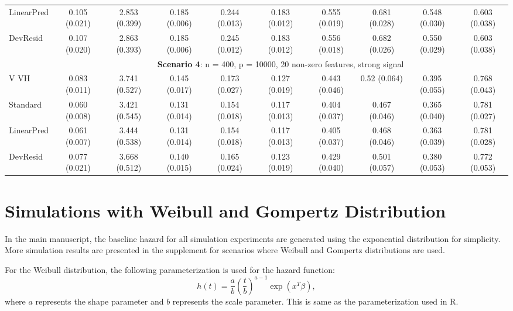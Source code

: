 \documentclass{article}
\begin{document}
\begin{landscape}
\begin{table}[h]
\begin{tabular}[t]{lccccccccc}
 LinearPred  & 0.105 (0.021) & 2.853 (0.399) & 0.185 (0.006) & 0.244 (0.013) & 0.183 (0.012) & 0.555 (0.019) & 0.681 (0.028) & 0.548 (0.030) & 0.603 (0.038) \\
 DevResid  & 0.107 (0.020) & 2.863 (0.393) & 0.185 (0.006) & 0.245 (0.012) & 0.183 (0.012) & 0.556 (0.018) & 0.682 (0.026) & 0.550 (0.029) & 0.603 (0.038) \\
\addlinespace
&\multicolumn{9}{c}{\textbf{Scenario 4}: n = 400, p = 10000, 20 non-zero features, strong signal}\\
\cline{2-10}
 V VH  & 0.083 (0.011) & 3.741 (0.527) & 0.145 (0.017) & 0.173 (0.027) & 0.127 (0.019) & 0.443 (0.046) & 0.52 (0.064) & 0.395 (0.055) & 0.768 (0.043) \\
 Standard  & 0.060 (0.008) & 3.421 (0.545) & 0.131 (0.014) & 0.154 (0.018) & 0.117 (0.013) & 0.404 (0.037) & 0.467 (0.046) & 0.365 (0.040) & 0.781 (0.027) \\
 LinearPred  & 0.061 (0.007) & 3.444 (0.538) & 0.131 (0.014) & 0.154 (0.018) & 0.117 (0.013) & 0.405 (0.037) & 0.468 (0.046) & 0.363 (0.039) & 0.781 (0.028) \\ 
 DevResid  & 0.077 (0.021) & 3.668 (0.512) & 0.140 (0.015) & 0.165 (0.024) & 0.123 (0.019) & 0.429 (0.040) & 0.501 (0.057) & 0.380 (0.053) & 0.772 (0.053) \\
\bottomrule
\end{tabular}
\end{table}


\section{Simulations with Weibull and Gompertz Distribution}

In the main manuscript, the baseline hazard for all simulation experiments are generated using the exponential distribution for simplicity. More simulation results are presented in the supplement for scenarios where Weibull and Gompertz distributions are used.

For the Weibull distribution, the following parameterization is used for the hazard function:
$$h(t) = \frac{a}{b}(\frac{t}{b})^{a - 1}\exp{(x^{T}\beta)}, $$
where $a$ represents the shape parameter and $b$ represents the scale parameter. This is same as the parameterization used in R.




\end{landscape}
\end{document}
